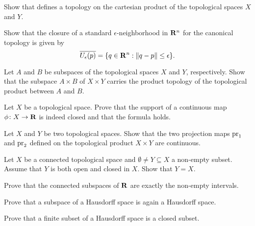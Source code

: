 \begin{xca}
  Show that  defines a topology on the cartesian
  product of the topological spaces $X$ and $Y$.
\end{xca}

\begin{xca}
  Show that the closure of a standard $\epsilon$-neighborhood in $\mathbf{R}^n$
  for the canonical topology is given by
  \begin{equation}
    \overline{U_\epsilon(p)} = \lbrace q \in \mathbf{R}^n : \lVert q - p\rVert \leq \epsilon\rbrace.
  \end{equation}
\end{xca}

\begin{xca}
  Let $A$ and $B$ be subspaces of the topological spaces $X$ and $Y$, respectively.
  Show that the subspace $A \times B$ of $X \times Y$ carries the
  product topology of the topological product between $A$ and $B$.
\end{xca}

\begin{xca}
  Let $X$ be a topological space. Prove that the support of a continuous map
  $\phi\colon X \to \mathbf{R}$ is indeed closed and that the formula 
  holds.
\end{xca}

\begin{xca}
  Let $X$ and $Y$ be two topological spaces. Show that the two projection maps
  $\mathrm{pr}_1$ and $\mathrm{pr}_2$ defined on the topological product $X \times Y$ are
  continuous.
\end{xca}

\begin{xca}
  Let $X$ be a connected topological space and $\emptyset \neq Y \subseteq X$
  a non-empty subset. Assume that $Y$ is both open and closed in $X$. Show that
  $Y = X$.
\end{xca}

\begin{xca}
  Prove that the connected subspaces of $\mathbf{R}$ are exactly the non-empty
  intervals.
\end{xca}

\begin{xca}
  Prove that a subspace of a Hausdorff space is again a Hausdorff space.
\end{xca}

\begin{xca}
  Prove that a finite subset of a Hausdorff space is a closed subset.
\end{xca}

